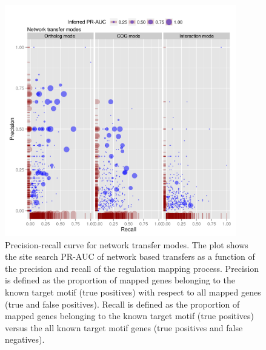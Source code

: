 \begin{figure}
  \centering
  \includegraphics[width=0.9\textwidth]{figures/chapter3/network-transfer-auc}
  \caption[Precision-recall curve for network transfer modes.]{Precision-recall
    curve for network transfer modes. The plot shows the site search PR-AUC of
    network based transfers as a function of the precision and recall of the
    regulation mapping process. Precision is defined as the proportion of
    mapped genes belonging to the known target motif (true positives) with
    respect to all mapped genes (true and false positives). Recall is defined
    as the proportion of mapped genes belonging to the known target motif (true
    positives) versus the all known target motif genes (true positives and
    false negatives).}
\label{fig:network-transfer-auc}
\end{figure}

